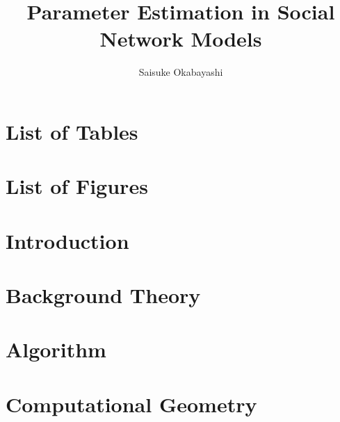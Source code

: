 \documentclass[oneside]{myumnStatThesis}
\author{Saisuke Okabayashi}
\title{Parameter Estimation in 
 Social Network Models}
\begin{document}
\maketitlepage %

\begin{abstract}

\end{abstract}

\tableofcontents %

\newpage
\chapter*{List of Tables}
{\def\chapter*#1{}
\listoftables}

\newpage
\chapter*{List of Figures}
{\def\chapter*#1{}
\listoffigures}


\mainmatter
\onehalfspacing %
\small  %

\chapter{Introduction}


\chapter{Background Theory}\label{Chapter:Background}


\chapter{Algorithm}
 

\chapter{Computational Geometry} \label{Chapter:Linear programming}
 
%
\end{document}
